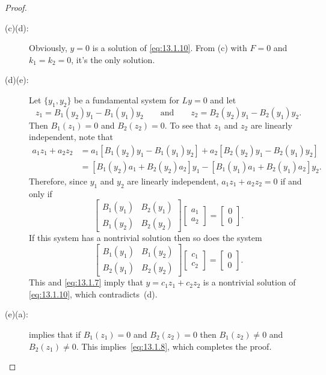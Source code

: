 \begin{proof}
\begin{description}
\item[(c)\textRightarrow(d):] Obviously, $y=0$ is a solution of
\eqref{eq:13.1.10}. From (c) with $F=0$ and $k_{1}=k_{2}=0$, it's the only
solution.

\item[(d)\textRightarrow(e):] Let  $\{y_{1},y_{2}\}$ be a fundamental
system for $Ly=0$ and  let
\[
z_{1}=B_{1}(y_{2})y_{1}-B_{1}(y_{1})y_{2}\qquad\text{and}\qquad
z_{2}=B_{2}(y_{2})y_{1}-B_{2}(y_{1})y_{2}.
\]
Then $B_{1}(z_{1})=0$  and $B_{2}(z_{2})=0$. To see
that $z_{1}$ and $z_{2}$ are linearly independent, note that
\begin{align*}
a_{1}z_{1}+a_{2}z_{2}&=
a_{1}[B_{1}(y_{2})y_{1}-B_{1}(y_{1})y_{2}]+
a_{2}[B_{2}(y_{2})y_{1}-B_{2}(y_{1})y_{2}]\\
&=
[B_{1}(y_{2})a_{1}+B_{2}(y_{2})a_{2}]y_{1}-[B_{1}(y_{1})a_{1}+B_{2}(y_{1})a_{2}]y_{2}.
\end{align*}
Therefore, since $y_{1}$ and $y_{2}$ are linearly independent,
$a_{1}z_{1}+a_{2}z_{2}=0$ if and only if
\[
\begin{bmatrix}
B_{1}(y_{1})&B_{2}(y_{1})\\
B_{1}(y_{2})&B_{2}(y_{2})
\end{bmatrix}
\begin{bmatrix}
a_{1}\\a_{2}
\end{bmatrix}=
\begin{bmatrix}
0\\0
\end{bmatrix}.
\]
If this system has a nontrivial solution then so does the system
\[
\begin{bmatrix}
B_{1}(y_{1})&B_{1}(y_{2})\\
B_{2}(y_{1})&B_{2}(y_{2})
\end{bmatrix}
\begin{bmatrix}
c_{1} \\c_{2}
\end{bmatrix}=
\begin{bmatrix}
0\\0
\end{bmatrix}.
\]
This and \eqref{eq:13.1.7} imply that $y=c_{1}z_{1}+c_{2}z_{2}$ is
a nontrivial solution of \eqref{eq:13.1.10}, which contradicts~(d).

\item[(e)\textRightarrow(a):]
 implies that if  $B_{1}(z_{1})=0$  and
$B_{2}(z_{2})=0$ then $B_{1}(z_{2})\ne0$ and $B_{2}(z_{1})\ne0$.
This implies~\eqref{eq:13.1.8}, which completes the proof.\qedhere
\end{description}
\end{proof}

